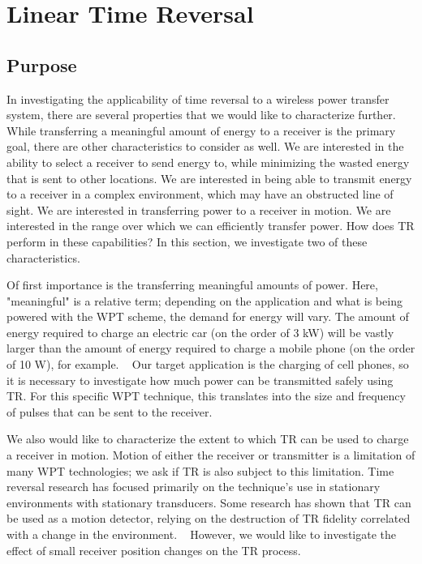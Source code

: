 \chapter{Linear Time Reversal}
\label{ch:ltr}

\section{Purpose}
\label{sec:ltr-purpose}

In investigating the applicability of time reversal to a wireless power transfer system, there are several properties that we would like to characterize further. While transferring a meaningful amount of energy to a receiver is the primary goal, there are other characteristics to consider as well. We are interested in the ability to select a receiver to send energy to, while minimizing the wasted energy that is sent to other locations. We are interested in being able to transmit energy to a receiver in a complex environment, which may have an obstructed line of sight. We are interested in transferring power to a receiver in motion. We are interested in the range over which we can efficiently transfer power. How does TR perform in these capabilities? In this section, we investigate two of these characteristics.

Of first importance is the transferring meaningful amounts of power. Here, "meaningful" is a relative term; depending on the application and what is being powered with the WPT scheme, the demand for energy will vary. The amount of energy required to charge an electric car (on the order of 3 kW) will be vastly larger than the amount of energy required to charge a mobile phone (on the order of 10 W), for example. ~\cite{witricity2013subsea} Our target application is the charging of cell phones, so it is necessary to investigate how much power can be transmitted safely using TR. For this specific WPT technique, this translates into the size and frequency of pulses that can be sent to the receiver.

We also would like to characterize the extent to which TR can be used to charge a receiver in motion. Motion of either the receiver or transmitter is a limitation of many WPT technologies; we ask if TR is also subject to this limitation. Time reversal research has focused primarily on the technique's use in stationary environments with stationary transducers. Some research has shown that TR can be used as a motion detector, relying on the destruction of TR fidelity correlated with a change in the environment. ~\cite{taddese_sensing_2010} However, we would like to investigate the effect of small receiver position changes on the TR process. 

